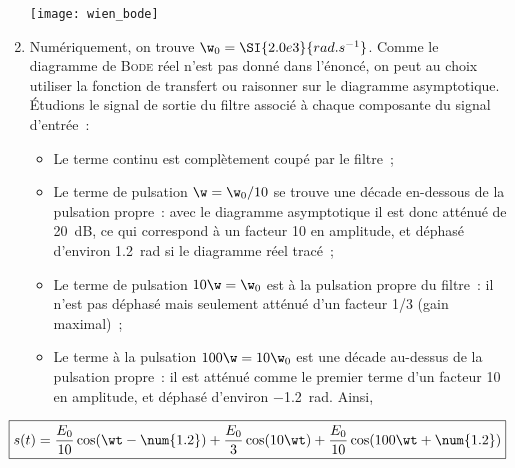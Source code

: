 \documentclass[a4paper, 12pt, final, garamond]{book}
\begin{document}
\begin{enumerate}
        \begin{center}
            \texttt{[image: wien\_bode]}
        \end{center}
    \item Numériquement, on trouve $\w_0 = \SI{2.0e3}{rad.s^{-1}}$. Comme le
        diagramme de \textsc{Bode} réel n'est pas donné dans l'énoncé, on peut
        au choix utiliser la fonction de transfert ou raisonner sur le diagramme
        asymptotique. Étudions le signal de sortie du filtre associé à chaque
        composante du signal d'entrée~:
        \begin{itemize}
            \item Le terme continu est complètement coupé par le filtre~;
            \item Le terme de pulsation $\w = \w_0/10$ se trouve une décade
                en-dessous de la pulsation propre~: avec le diagramme
                asymptotique il est donc atténué de \SI{20}{dB}, ce qui
                correspond à un facteur 10 en amplitude, et déphasé d'environ
                \SI{1.2}{rad} si le diagramme réel tracé~;
            \item Le terme de pulsation $10\w = \w_0$ est à la pulsation propre
                du filtre~: il n'est pas déphasé mais seulement atténué d'un
                facteur 1/3 (gain maximal)~;
            \item Le terme à la pulsation $100\w = 10\w_0$ est une décade
                au-dessus de la pulsation propre~: il est atténué comme le
                premier terme d'un facteur 10 en amplitude, et déphasé d'environ
                \SI{-1.2}{rad}. Ainsi,
        \end{itemize}
\end{enumerate}
\[\boxed{
    s(t) =
        \frac{E_0}{10}\cos (\wt - \num{1.2}) +
        \frac{E_0}{3}\cos(10\wt) +
        \frac{E_0}{10}\cos (100\wt + \num{1.2})
}\]
\end{document}
